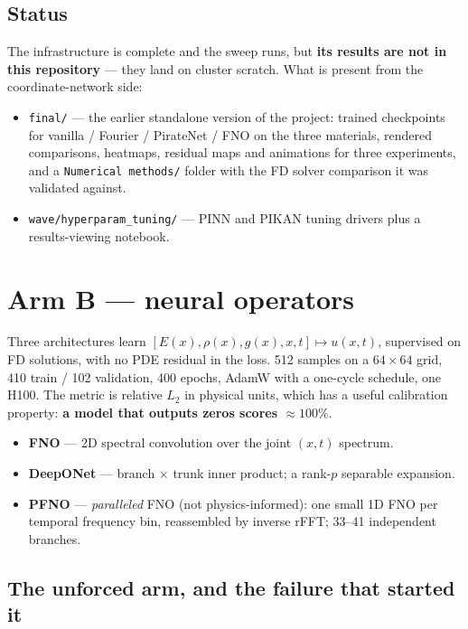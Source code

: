 \documentclass[11pt,a4paper]{article}
\newcommand{\relL}{relative $L_2$}
\begin{document}
\subsection{Status}

The infrastructure is complete and the sweep runs, but \textbf{its results are
not in this repository} --- they land on cluster scratch. What is present from
the coordinate-network side:

\begin{itemize}[leftmargin=*,itemsep=2pt]
\item \texttt{final/} --- the earlier standalone version of the project: trained
checkpoints for vanilla / Fourier / PirateNet / FNO on the three materials,
rendered comparisons, heatmaps, residual maps and animations for three
experiments, and a \texttt{Numerical methods/} folder with the FD solver
comparison it was validated against.
\item \texttt{wave/hyperparam\_tuning/} --- PINN and PIKAN tuning drivers plus a
results-viewing notebook.
\end{itemize}

\section{Arm B --- neural operators}

Three architectures learn $[E(x),\rho(x),g(x),x,t]\mapsto u(x,t)$, supervised on
FD solutions, with no PDE residual in the loss. 512 samples on a $64\times64$
grid, 410 train / 102 validation, 400 epochs, AdamW with a one-cycle schedule,
one H100. The metric is \relL{} in physical units, which has a useful
calibration property: \textbf{a model that outputs zeros scores $\approx100\%$}.

\begin{itemize}[leftmargin=*,itemsep=2pt]
\item \textcolor{fnoblue}{\textbf{FNO}} --- 2D spectral convolution over the
joint $(x,t)$ spectrum.
\item \textcolor{donrose}{\textbf{DeepONet}} --- branch $\times$ trunk inner
product; a rank-$p$ separable expansion.
\item \textcolor{pfnogold}{\textbf{PFNO}} --- \emph{paralleled} FNO (not
physics-informed): one small 1D FNO per temporal frequency bin, reassembled by
inverse rFFT; 33--41 independent branches.
\end{itemize}

\subsection{The unforced arm, and the failure that started it}
\end{document}
